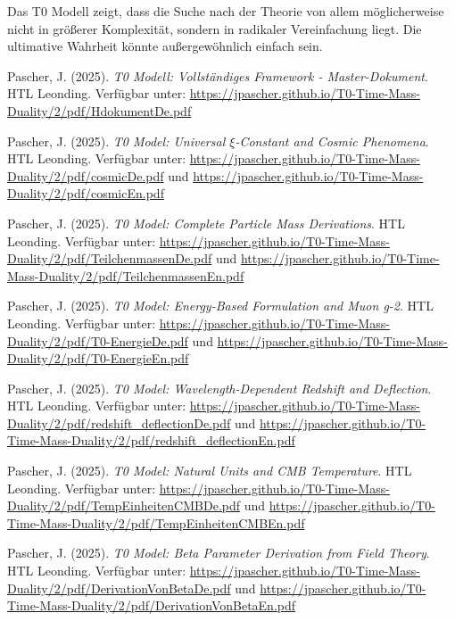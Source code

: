 \documentclass[12pt,a4paper]{report}
\begin{document}
	\begin{revolutionaer}
		Das T0 Modell zeigt, dass die Suche nach der Theorie von allem möglicherweise nicht in größerer Komplexität, sondern in radikaler Vereinfachung liegt. Die ultimative Wahrheit könnte außergewöhnlich einfach sein.
	\end{revolutionaer}
	
	\begin{thebibliography}{99}
		Pascher, J. (2025). \textit{T0 Modell: Vollständiges Framework - Master-Dokument}. HTL Leonding. Verfügbar unter: \url{https://jpascher.github.io/T0-Time-Mass-Duality/2/pdf/HdokumentDe.pdf}
		
		Pascher, J. (2025). \textit{T0 Model: Universal $\xi$-Constant and Cosmic Phenomena}. HTL Leonding. Verfügbar unter: \url{https://jpascher.github.io/T0-Time-Mass-Duality/2/pdf/cosmicDe.pdf} und \url{https://jpascher.github.io/T0-Time-Mass-Duality/2/pdf/cosmicEn.pdf}
		
		Pascher, J. (2025). \textit{T0 Model: Complete Particle Mass Derivations}. HTL Leonding. Verfügbar unter: \url{https://jpascher.github.io/T0-Time-Mass-Duality/2/pdf/TeilchenmassenDe.pdf} und \url{https://jpascher.github.io/T0-Time-Mass-Duality/2/pdf/TeilchenmassenEn.pdf}
		
		Pascher, J. (2025). \textit{T0 Model: Energy-Based Formulation and Muon g-2}. HTL Leonding. Verfügbar unter: \url{https://jpascher.github.io/T0-Time-Mass-Duality/2/pdf/T0-EnergieDe.pdf} und \url{https://jpascher.github.io/T0-Time-Mass-Duality/2/pdf/T0-EnergieEn.pdf}
		
		Pascher, J. (2025). \textit{T0 Model: Wavelength-Dependent Redshift and Deflection}. HTL Leonding. Verfügbar unter: \url{https://jpascher.github.io/T0-Time-Mass-Duality/2/pdf/redshift_deflectionDe.pdf} und \url{https://jpascher.github.io/T0-Time-Mass-Duality/2/pdf/redshift_deflectionEn.pdf}
		
		Pascher, J. (2025). \textit{T0 Model: Natural Units and CMB Temperature}. HTL Leonding. Verfügbar unter: \url{https://jpascher.github.io/T0-Time-Mass-Duality/2/pdf/TempEinheitenCMBDe.pdf} und \url{https://jpascher.github.io/T0-Time-Mass-Duality/2/pdf/TempEinheitenCMBEn.pdf}
		
		Pascher, J. (2025). \textit{T0 Model: Beta Parameter Derivation from Field Theory}. HTL Leonding. Verfügbar unter: \url{https://jpascher.github.io/T0-Time-Mass-Duality/2/pdf/DerivationVonBetaDe.pdf} und \url{https://jpascher.github.io/T0-Time-Mass-Duality/2/pdf/DerivationVonBetaEn.pdf}
		

\end{thebibliography}
\end{document}
